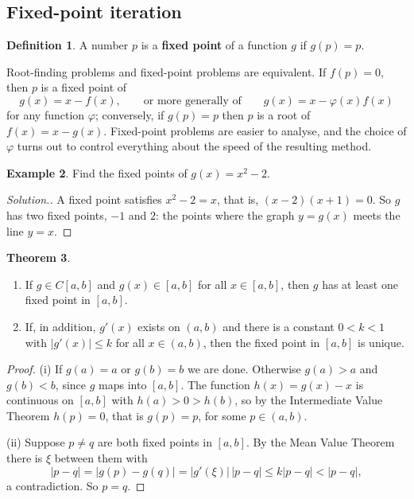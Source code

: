 \documentclass[11pt,a4paper]{article}
\numberwithin{equation}{section}
\theoremstyle{definition}
\newtheorem{thm}{Theorem}[subsection]
\newtheorem{defn}[thm]{Definition}
\newtheorem{exa}[thm]{Example}
\newenvironment{solution}
  {\renewcommand{\qedsymbol}{}\begin{proof}[\textit{Solution}.]}
  {\end{proof}}
\begin{document}
\subsection{Fixed-point iteration}
\label{sec:fixedpoint}

\begin{defn}
A number $p$ is a \textbf{fixed point} of a function $g$ if $g(p) = p$.
\end{defn}

Root-finding problems and fixed-point problems are equivalent. If $f(p) = 0$, then $p$ is a fixed point of
$$g(x) = x-f(x),\qquad\text{or more generally of}\qquad g(x) = x-\varphi(x)f(x)$$
for any function $\varphi$; conversely, if $g(p) = p$ then $p$ is a root of $f(x) = x-g(x)$. Fixed-point problems are easier to
analyse, and the choice of $\varphi$ turns out to control everything about the speed of the resulting method.

\begin{exa}
Find the fixed points of $g(x) = x^2-2$.
\end{exa}

\begin{solution}
A fixed point satisfies $x^2-2 = x$, that is, $(x-2)(x+1) = 0$. So $g$ has two fixed points, $-1$ and $2$: the points where the graph
$y = g(x)$ meets the line $y = x$.
\end{solution}

\begin{thm}
\label{thm:fpexist}
\begin{enumerate}
\item[(i)] If $g\in C[a,b]$ and $g(x)\in[a,b]$ for all $x\in[a,b]$, then $g$ has at least one fixed point in $[a,b]$.
\item[(ii)] If, in addition, $g'(x)$ exists on $(a,b)$ and there is a constant $0<k<1$ with $|g'(x)|\leq k$ for all $x\in(a,b)$, then the
fixed point in $[a,b]$ is unique.
\end{enumerate}
\end{thm}

\begin{proof}
(i) If $g(a) = a$ or $g(b) = b$ we are done. Otherwise $g(a)>a$ and $g(b)<b$, since $g$ maps into $[a,b]$. The function $h(x) = g(x)-x$
is continuous on $[a,b]$ with $h(a)>0>h(b)$, so by the Intermediate Value Theorem $h(p) = 0$, that is $g(p) = p$, for some
$p\in(a,b)$.

(ii) Suppose $p\neq q$ are both fixed points in $[a,b]$. By the Mean Value Theorem there is $\xi$ between them with
$$|p-q| = |g(p)-g(q)| = |g'(\xi)|\,|p-q|\leq k|p-q|<|p-q|,$$
a contradiction. So $p = q$.
\end{proof}
\end{document}
